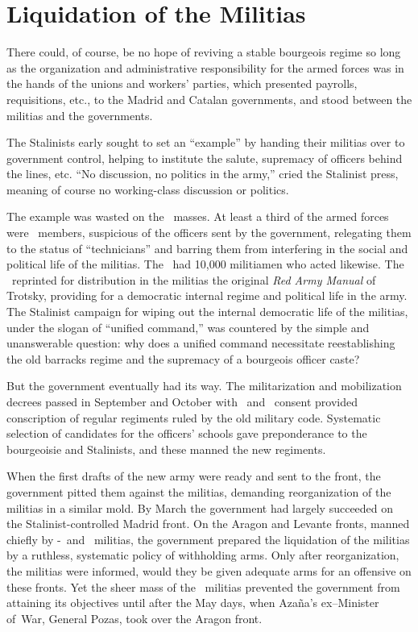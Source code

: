 \section{Liquidation of the Militias}

There could, of course, be no hope of reviving a stable bourgeois regime so long as the organization and administrative responsibility for the armed forces was in the hands of the unions and workers’ parties, which presented payrolls, requisitions, etc., to the Madrid and Catalan governments, and stood between the militias and the governments.

The Stalinists early sought to set an ``example'' by handing their militias over to government control, helping to institute the salute, supremacy of officers behind the lines, etc. ``No discussion, no politics in the army,'' cried the Stalinist press, meaning of course no working-class discussion or politics.

The example was wasted on the \CNT\ masses. At least a third of the armed forces were \CNT\ members, suspicious of the officers sent by the government, relegating them to the status of ``technicians'' and barring them from interfering in the social and political life of the militias. The \POUM\ had 10,000 militiamen who acted likewise. The \POUM\ reprinted for distribution in the militias the original \emph{Red Army Manual} of Trotsky, providing for a democratic internal regime and political life in the army. The Stalinist campaign for wiping out the internal democratic life of the militias, under the slogan of ``unified command,'' was countered by the simple and unanswerable question: why does a unified command necessitate reestablishing the old barracks regime and the supremacy of a bourgeois officer caste?

But the government eventually had its way. The militarization and mobilization decrees passed in September and October with \CNT\ and \POUM\ consent provided conscription of regular regiments ruled by the old military code. Systematic selection of candidates for the officers’ schools gave preponderance to the bourgeoisie and Stalinists, and these manned the new regiments.

When the first drafts of the new army were ready and sent to the front, the government pitted them against the militias, demanding reorganization of the militias in a similar mold. By March the government had largely succeeded on the Stalinist-controlled Madrid front. On the Aragon and Levante fronts, manned chiefly by \CNT-\FAI\ and \POUM\ militias, the government prepared the liquidation of the militias by a ruthless, systematic policy of withholding arms. Only after reorganization, the militias were informed, would they be given adequate arms for an offensive on these fronts. Yet the sheer mass of the \CNT\ militias prevented the government from attaining its objectives until after the May days, when Azaña’s ex--Minister of~War, General Pozas, took over the Aragon front.

